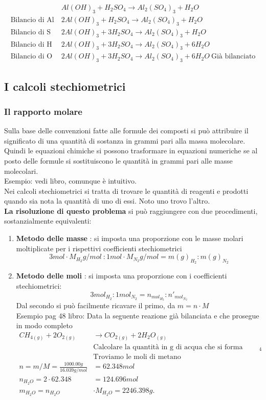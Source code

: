 \documentclass{article}
\begin{document}
\begin{align*}
    &Al(OH)_3 + H_2SO_4 \rightarrow Al_2(SO_4)_3 + H_2O\\
    \text{Bilancio di Al}\ &2Al(OH)_3 + H_2SO_4 \rightarrow Al_2(SO_4)_3 + H_2O\\
    \text{Bilancio di S} \ &2Al(OH)_3 + 3H_2SO_4 \rightarrow Al_2(SO_4)_3 + H_2O\\
    \text{Bilancio di H} \ &2Al(OH)_3 + 3H_2SO_4 \rightarrow Al_2(SO_4)_3 + 6H_2O\\
    \text{Bilancio di O} \ &2Al(OH)_3 + 3H_2SO_4 \rightarrow Al_2(SO_4)_3 + 6H_2O \ \text{Già bilanciato}
\end{align*}

\subsection{I calcoli stechiometrici}
\subsubsection{Il rapporto molare}
Sulla base delle convenzioni fatte alle formule dei composti si può attribuire il significato di una quantità di
sostanza in grammi pari alla massa molecolare. Quindi le equazioni chimiche si possono trasformare in 
equazioni numeriche se al posto delle formule si sostituiscono le quantità in grammi pari alle masse molecolari.\\
Esempio: vedi libro, comunque è intuitivo.\\
Nei calcoli stechiometrici si tratta di trovare le quantità di reagenti e prodotti quando sia nota la quantità
di uno di essi. Noto uno trovo l'altro.\\
\textbf{La risoluzione di questo problema} si può raggiungere con due procedimenti, sostanzialmente equivalenti:
\begin{enumerate}
    \item \textbf{Metodo delle masse} : si imposta una proporzione con le masse molari moltiplicate per i rispettivi
    coefficienti stechiometrici
    \[3mol \cdot M_{H_2}g/mol \ : 1mol \cdot M_{N_2}g/mol = m(g)_{H_2} : m(g)_{N_2}\]
    \item \textbf{Metodo delle moli} : si imposta una proporzione con i coefficienti stechiometrici:
    \[3mol_{H_2} : 1mol_{N_2} = n_{mol_{H_2}} : n'_{mol_{N_2}}\]
    Dal secondo si può facilmente ricavare il primo, da $m=n\cdot M$\\
    Esempio pag 48 libro: Data la seguente reazione già bilanciata e che prosegue in modo completo
    \begin{align*}
        CH_{4(g)} + 2O_{2(g)} &\rightarrow CO_{2(g)} + 2H_2O_{(g)}\\
        &\text{Calcolare la quantità in g di acqua che si forma bruciando 1kg di CH$_4$}\\
        &\text{Troviamo le moli di metano }\\
        n=m/M = \frac{1000.00g}{16.039g/mol} &= 62.348 mol\\
        n_{H_2O} = 2\cdot 62.348 &= 124.696 mol\\
        m_{H_2O} = n_{H_2O} &\cdot M_{H_2O} = 2246.398g.
    \end{align*}
\end{enumerate}
\end{document}
